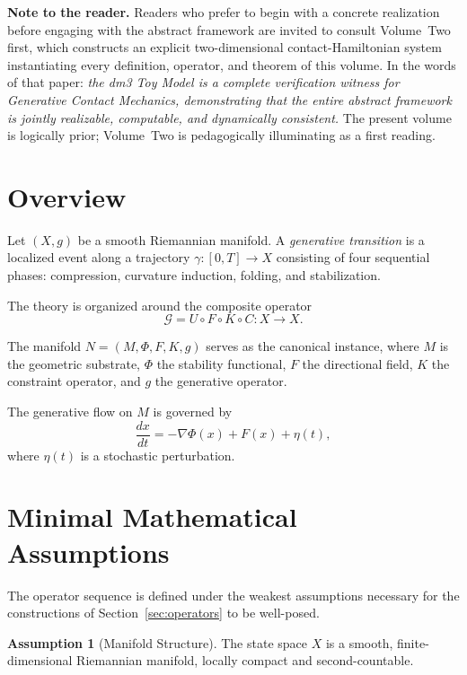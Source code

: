 \documentclass[12pt, oneside]{book}
\theoremstyle{plain}
\theoremstyle{definition}
\newtheorem{assumption}{Assumption}[section]
\theoremstyle{remark}
\begin{document}
\medskip

\noindent\textbf{Note to the reader.}
Readers who prefer to begin with a concrete realization before
engaging with the abstract framework are invited to consult
Volume~Two first, which constructs an explicit two-dimensional
contact-Hamiltonian system instantiating every definition, operator,
and theorem of this volume. In the words of that paper:
\emph{the dm3 Toy Model is a complete verification witness for
Generative Contact Mechanics, demonstrating that the entire abstract
framework is jointly realizable, computable, and dynamically consistent.}
The present volume is logically prior; Volume~Two is pedagogically
illuminating as a first reading.

\section{Overview}

Let $(X, g)$ be a smooth Riemannian manifold. A \emph{generative
transition} is a localized event along a trajectory
$\gamma : [0,T] \to X$ consisting of four sequential phases:
compression, curvature induction, folding, and stabilization.

The theory is organized around the composite operator
\[
\mathcal{G} = U \circ F \circ K \circ C : X \to X.
\]

The manifold $N = (M, \Phi, F, K, g)$ serves as the canonical
instance, where $M$ is the geometric substrate, $\Phi$ the stability
functional, $F$ the directional field, $K$ the constraint operator,
and $g$ the generative operator.

The generative flow on $M$ is governed by
\[
\frac{dx}{dt} = -\nabla \Phi(x) + F(x) + \eta(t),
\]
where $\eta(t)$ is a stochastic perturbation.

\section{Minimal Mathematical Assumptions}

The operator sequence is defined under the weakest assumptions
necessary for the constructions of Section~\ref{sec:operators} to be
well-posed.

\begin{assumption}[Manifold Structure]\label{ass:manifold}
The state space $X$ is a smooth, finite-dimensional Riemannian
manifold, locally compact and second-countable.
\end{assumption}
\end{document}

